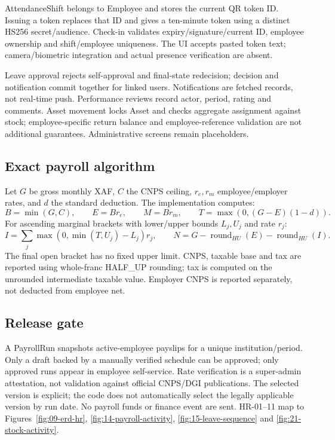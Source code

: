 \documentclass[10pt,a4paper]{article}
\begin{document}
AttendanceShift belongs to Employee and stores the current QR token ID. Issuing
a token replaces that ID and gives a ten-minute token using a distinct HS256
secret/audience. Check-in validates expiry/signature/current ID, employee ownership
and shift/employee uniqueness. The UI accepts pasted token text; camera/biometric
integration and actual presence verification are absent.

Leave approval rejects self-approval and final-state redecision; decision and
notification commit together for linked users. Notifications are fetched records,
not real-time push. Performance reviews record actor, period, rating and comments.
Asset movement locks Asset and checks aggregate assignment against stock;
employee-specific return balance and employee-reference validation are not additional
guarantees. Administrative screens remain placeholders.

\subsection{Exact payroll algorithm}
Let $G$ be gross monthly XAF, $C$ the CNPS ceiling, $r_e,r_m$ employee/employer rates,
and $d$ the standard deduction. The implementation computes:
\[
 B=\min(G,C),\qquad E=B r_e,\qquad M=B r_m,\qquad
 T=\max(0,(G-E)(1-d)).
\]
For ascending marginal brackets with lower/upper bounds $L_j,U_j$ and rate $r_j$:
\[
 I=\sum_j \max(0,\min(T,U_j)-L_j)r_j,\qquad
 N=G-\operatorname{round}_{HU}(E)-\operatorname{round}_{HU}(I).
\]
The final open bracket has no fixed upper limit.
CNPS, taxable base and tax are reported using whole-franc HALF\_UP rounding;
tax is computed on the unrounded intermediate taxable value.
Employer CNPS is reported separately, not deducted from employee net.

\subsection{Release gate}
A PayrollRun snapshots active-employee payslips for a unique institution/period.
Only a draft backed by a manually verified schedule can be approved; only approved
runs appear in employee self-service. Rate verification is a super-admin attestation,
not validation against official CNPS/DGI publications. The selected version is explicit;
the code does not automatically select the legally applicable version by run date.
No payroll funds or finance event are sent. HR-01--11 map to
Figures~\ref{fig:09-erd-hr}, \ref{fig:14-payroll-activity}, \ref{fig:15-leave-sequence}
and \ref{fig:21-stock-activity}.
\end{document}

